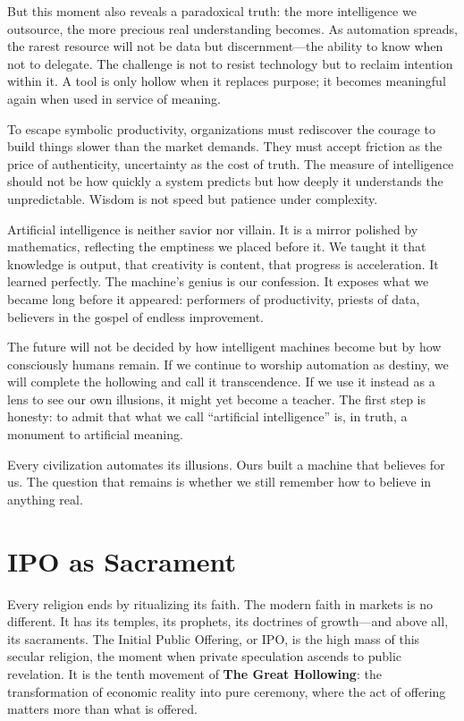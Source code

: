 \documentclass[11pt,twoside]{book}
\begin{document}
But this moment also reveals a paradoxical truth: the more intelligence we outsource, the more precious real understanding becomes.  As automation spreads, the rarest resource will not be data but discernment—the ability to know when not to delegate.  The challenge is not to resist technology but to reclaim intention within it.  A tool is only hollow when it replaces purpose; it becomes meaningful again when used in service of meaning.

To escape symbolic productivity, organizations must rediscover the courage to build things slower than the market demands.  They must accept friction as the price of authenticity, uncertainty as the cost of truth.  The measure of intelligence should not be how quickly a system predicts but how deeply it understands the unpredictable.  Wisdom is not speed but patience under complexity.

Artificial intelligence is neither savior nor villain.  It is a mirror polished by mathematics, reflecting the emptiness we placed before it.  We taught it that knowledge is output, that creativity is content, that progress is acceleration.  It learned perfectly.  The machine’s genius is our confession.  It exposes what we became long before it appeared: performers of productivity, priests of data, believers in the gospel of endless improvement.

The future will not be decided by how intelligent machines become but by how consciously humans remain.  If we continue to worship automation as destiny, we will complete the hollowing and call it transcendence.  If we use it instead as a lens to see our own illusions, it might yet become a teacher.  The first step is honesty: to admit that what we call “artificial intelligence” is, in truth, a monument to artificial meaning.

Every civilization automates its illusions.  Ours built a machine that believes for us.  The question that remains is whether we still remember how to believe in anything real.

\chapter{IPO as Sacrament}
\label{ch:10}

Every religion ends by ritualizing its faith.  
The modern faith in markets is no different.  It has its temples, its prophets, its doctrines of growth—and above all, its sacraments.  The Initial Public Offering, or IPO, is the high mass of this secular religion, the moment when private speculation ascends to public revelation.  It is the tenth movement of \textbf{The Great Hollowing}: the transformation of economic reality into pure ceremony, where the act of offering matters more than what is offered.
\end{document}
